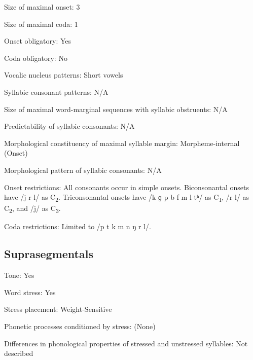 {\begin{appendixdesc}
\item[Size of maximal onset:] 3

\item[Size of maximal coda:] 1

\item[Onset obligatory:] Yes

\item[Coda obligatory:] No

\item[Vocalic nucleus patterns:] Short vowels

\item[Syllabic consonant patterns:] N/A

\item[Size of maximal word-marginal sequences with syllabic obstruents:] N/A

\item[Predictability of syllabic consonants:] N/A

\item[Morphological constituency of maximal syllable margin:] Morpheme-internal (Onset)

\item[Morphological pattern of syllabic consonants:] N/A

\item[Onset restrictions:] All consonants occur in simple onsets. Biconsonantal onsets have /j r l/ as C\textsubscript{2}. Triconsonantal onsets have /k ɡ p b f m l tʰ/ as C\textsubscript{1}, /r l/ as C\textsubscript{2}, and /j/ as C\textsubscript{3}.

\item[Coda restrictions:] Limited to /p t k m n ŋ r l/.
\end{appendixdesc}
\subsection*{Suprasegmentals}
\begin{appendixdesc}
\item[Tone:] Yes

\item[Word stress:] Yes

\item[Stress placement:] Weight-Sensitive

\item[Phonetic processes conditioned by stress:] (None)

\item[Differences in phonological properties of stressed and unstressed syllables:] Not described


\end{appendixdesc}}
